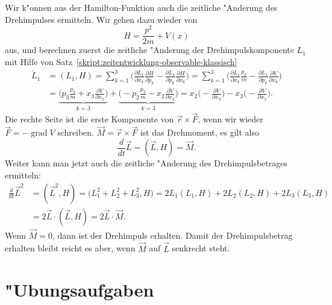 Wir k"onnen aus der Hamilton-Funktion auch die zeitliche "Anderung des
Drehimpulses ermitteln. Wir gehen dazu wieder von 
\[
H=\frac{p^2}{2m}+V(x)
\]
aus, und berechnen zuerst die zeitliche "Anderung der Drehimpulskomponente
$L_1$ mit Hilfe von Satz~\ref{skript:zeitentwicklung-observable-klassisch}
\begin{align*}
\dot L_1
&=
(L_1,H)
=
\sum_{k=1}^3\biggl(
\frac{\partial L_1}{\partial x_k}\frac{\partial H}{\partial p_k}
-
\frac{\partial L_1}{\partial p_k}\frac{\partial H}{\partial x_k}
\biggr)
=
\sum_{k=1}^3\biggl(
\frac{\partial L_1}{\partial x_k}\frac{p_k}m
-
\frac{\partial L_1}{\partial p_k}\frac{\partial V}{\partial x_k}
\biggr)
\\
&=
\underbrace{
\biggl(
p_3
\frac{p_2}{m}
+
x_3
\frac{\partial V}{\partial x_2}
\biggr)
}_{k=3}
+
\underbrace{
\biggl(
-p_2\frac{p_3}{m}
-
x_2
\frac{\partial V}{\partial x_3}
\biggr)
}_{k=3}
=
x_2\biggl(-\frac{\partial V}{\partial x_3}\biggr)
-
x_3\biggl(-\frac{\partial V}{\partial x_2}\biggr).
\end{align*}
Die rechte Seite ist die erste Komponente von $\vec r\times \vec F$, wenn
wir wieder $\vec F=-\operatorname{grad}V$ schreiben.
$\vec M=\vec r\times\vec F$ ist das Drehmoment, es gilt also
\[
\frac{d}{dt} \vec L=(\vec L,H)= \vec M.
\]
Weiter kann man jetzt auch die zeitliche "Anderung des Drehimpulsbetrages
ermitteln:
\begin{align*}
\frac{d}{dt}\vec L^2
&=
(\vec L^2,H)
=
\bigl( L_1^2+L_2^2+L_3^2,H)
=
2L_1(L_1,H)
+
2L_2(L_2,H)
+
2L_3(L_3,H)
\\
&=
2\vec L\cdot(\vec L,H)=2\vec L\cdot\vec M.
\end{align*}
Wenn $\vec M=0$, dann ist der Drehimpuls erhalten. Damit der Drehimpulsbetrag
erhalten bleibt reicht es aber, wenn $\vec M$ auf $\vec L$ senkrecht steht.

\section*{"Ubungsaufgaben}
\begin{uebungsaufgaben}
\item

\item

\item

\end{uebungsaufgaben}

